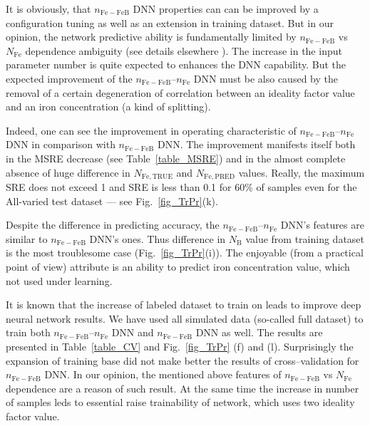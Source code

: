 \documentclass[journal]{IEEEtran}
\begin{document}
It is obviously, that $n_\mathrm{Fe-FeB}$ DNN  properties can can be improved by a configuration tuning as well as an extension in training dataset.
But in our opinion, the network predictive ability is fundamentally limited by $n_\mathrm{Fe-FeB}$ vs $N_\mathrm{Fe}$ dependence ambiguity (see details elsewhere \cite{OlikhJPS}).
The increase in the input parameter number is quite expected to enhances the DNN capability.
But the expected improvement of the $n_\mathrm{Fe-FeB}$--$n_\mathrm{Fe}$ DNN must be also caused by the removal of a certain degeneration of correlation between an ideality factor value and an iron concentration (a kind of splitting).

Indeed, one can see the improvement in operating characteristic
of $n_\mathrm{Fe-FeB}$--$n_\mathrm{Fe}$ DNN in comparison with $n_\mathrm{Fe-FeB}$ DNN.
The improvement manifests itself both in the MSRE decrease (see Table~\ref{table_MSRE}) and
in the almost complete absence of huge
difference in $N_\mathrm{Fe,TRUE}$ and $N_\mathrm{Fe,PRED}$ values.
Really, the maximum SRE does not exceed 1 and SRE is less than 0.1 for 60\% of samples
even for the All-varied test dataset --- see Fig.~\ref{fig_TrPr}(k).

Despite the difference in predicting accuracy,
the $n_\mathrm{Fe-FeB}$--$n_\mathrm{Fe}$ DNN's features are similar to  $n_\mathrm{Fe-FeB}$ DNN's ones.
Thus difference in $N_\mathrm{B}$ value from training dataset is the most troublesome case
(Fig.~\ref{fig_TrPr}(i)).
The enjoyable (from a practical point of view) attribute is an ability to predict iron concentration value, which not used under learning.

It is known \cite{Keras} that the increase of labeled dataset to train on leads to improve  deep neural network results.
We have used all simulated data (so-called full dataset) to train both
$n_\mathrm{Fe-FeB}$--$n_\mathrm{Fe}$ DNN and $n_\mathrm{Fe-FeB}$ DNN as well.
The results are presented in Table~\ref{table_CV} and Fig.~\ref{fig_TrPr} (f) and (l).
Surprisingly the expansion of training base did not make better the results of cross--validation
for $n_\mathrm{Fe-FeB}$ DNN.
In our opinion, the mentioned above features of $n_\mathrm{Fe-FeB}$ vs $N_\mathrm{Fe}$ dependence
are a reason of such result.
At the same time the increase in number of samples leds to essential raise trainability of network, which uses two ideality factor value.


\end{document}

